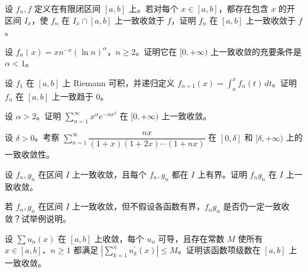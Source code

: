 \noindent\begin{minipage}{\textwidth}
设 $f_n,f$ 定义在有限闭区间 $[a,b]$ 上。若对每个 $x\in[a,b]$，都存在包含 $x$ 的开区间 $I_x$，使 $f_n$ 在 $I_x\cap[a,b]$ 上一致收敛于 $f$，证明 $f_n$ 在 $[a,b]$ 上一致收敛于 $f$。
\end{minipage}\par\vfill
\newpage
\noindent\begin{minipage}{\textwidth}
设 $f_n(x)=xn^{-x}(\ln n)^\alpha$，$n\ge2$。证明它在 $[0,+\infty)$ 上一致收敛的充要条件是 $\alpha<1$。
\end{minipage}\par\vfill
\noindent\begin{minipage}{\textwidth}
设 $f_1$ 在 $[a,b]$ 上 Riemann 可积，并递归定义 $f_{n+1}(x)=\int_a^xf_n(t)\,dt$。证明 $f_n$ 在 $[a,b]$ 上一致趋于 $0$。
\end{minipage}\par\vfill
\noindent\begin{minipage}{\textwidth}
设 $\alpha>2$。证明 $\sum_{n=1}^{\infty}x^\alpha e^{-nx^2}$ 在 $[0,+\infty)$ 上一致收敛。
\end{minipage}\par\vfill
\newpage
\noindent\begin{minipage}{\textwidth}
设 $\delta>0$。考察 $\sum_{n=1}^{\infty}\dfrac{nx}{(1+x)(1+2x)\cdots(1+nx)}$ 在 $[0,\delta]$ 和 $[\delta,+\infty)$ 上的一致收敛性。
\end{minipage}\par\vfill
\noindent\begin{minipage}{\textwidth}
设 $f_n,g_n$ 在区间 $I$ 上一致收敛，且每个 $f_n,g_n$ 都在 $I$ 上有界。证明 $f_ng_n$ 在 $I$ 上一致收敛。
\end{minipage}\par\vfill
\noindent\begin{minipage}{\textwidth}
若 $f_n,g_n$ 在区间 $I$ 上一致收敛，但不假设各函数有界，$f_ng_n$ 是否仍一定一致收敛？试举例说明。
\end{minipage}\par\vfill
\newpage
\noindent\begin{minipage}{\textwidth}
设 $\sum u_n(x)$ 在 $[a,b]$ 上收敛，每个 $u_n$ 可导，且存在常数 $M$ 使所有 $x\in[a,b]$、$n\ge1$ 都满足 $|\sum_{k=1}^nu_k^{\prime}(x)|\le M$。证明该函数项级数在 $[a,b]$ 上一致收敛。
\end{minipage}\par\vfill
